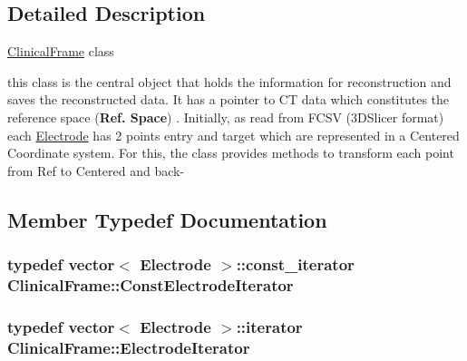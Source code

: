 \subsection{Detailed Description}
\hyperlink{classClinicalFrame}{Clinical\-Frame} class

this class is the central object that holds the information for reconstruction and saves the reconstructed data. It has a pointer to C\-T data which constitutes the reference space ({\bfseries Ref. Space}) . Initially, as read from F\-C\-S\-V (3\-D\-Slicer format) each \hyperlink{classElectrode}{Electrode} has 2 points entry and target which are represented in a Centered Coordinate system. For this, the class provides methods to transform each point from Ref to Centered and back-\/ 

\subsection{Member Typedef Documentation}
\hypertarget{classClinicalFrame_ab741d0da22f344965de240de63c8a381}{
\subsubsection[{Const\-Electrode\-Iterator}]{\setlength{\rightskip}{0pt plus 5cm}typedef vector$<$ {\bf Electrode} $>$\-::const\-\_\-iterator {\bf Clinical\-Frame\-::\-Const\-Electrode\-Iterator}}}\label{classClinicalFrame_ab741d0da22f344965de240de63c8a381}
\hypertarget{classClinicalFrame_a22b67ee42a429de47c1c12ffedf1a803}{
\subsubsection[{Electrode\-Iterator}]{\setlength{\rightskip}{0pt plus 5cm}typedef vector$<$ {\bf Electrode} $>$\-::iterator {\bf Clinical\-Frame\-::\-Electrode\-Iterator}}}\label{classClinicalFrame_a22b67ee42a429de47c1c12ffedf1a803}


